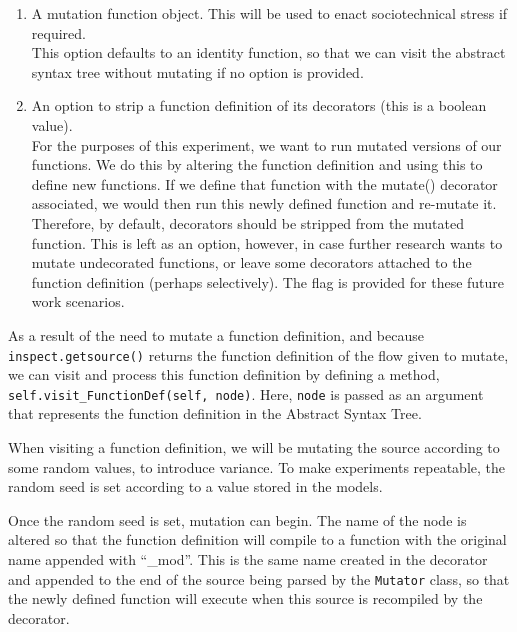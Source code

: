 \begin{enumerate}
    \item A mutation function object. This will be used to enact sociotechnical stress if required. \\
    This option defaults to an identity function, so that we can visit the abstract syntax tree without mutating if no option is provided.
    \item An option to strip a function definition of its decorators (this is a boolean value). \\
    For the purposes of this experiment, we want to run mutated versions of our functions. We do this by altering the function definition and using this to define new functions. If we define that function with the mutate() decorator associated, we would then run this newly defined function and re-mutate it. Therefore, by default, decorators should be stripped from the mutated function.
    This is left as an option, however, in case further research wants to mutate undecorated functions, or leave some decorators attached to the function definition (perhaps selectively). The flag is provided for these future work scenarios.
\end{enumerate} \par


As a result of the need to mutate a function definition, and because \texttt{inspect.getsource()} returns the function definition of the flow given to mutate, we can visit and process this function definition by defining a method, \texttt{self.visit\_FunctionDef(self, node)}. Here, \texttt{node} is passed as an argument that represents the function definition in the Abstract Syntax Tree. \par

When visiting a function definition, we will be mutating the source according to some random values, to introduce variance. To make experiments repeatable, the random seed is set according to a value stored in the models. \par

Once the random seed is set, mutation can begin. The name of the node is altered so that the function definition will compile to a function with the original name appended with ``\_mod''. This is the same name created in the decorator and appended to the end of the source being parsed by the \texttt{Mutator} class, so that the newly defined function will execute when this source is recompiled by the decorator. \par

